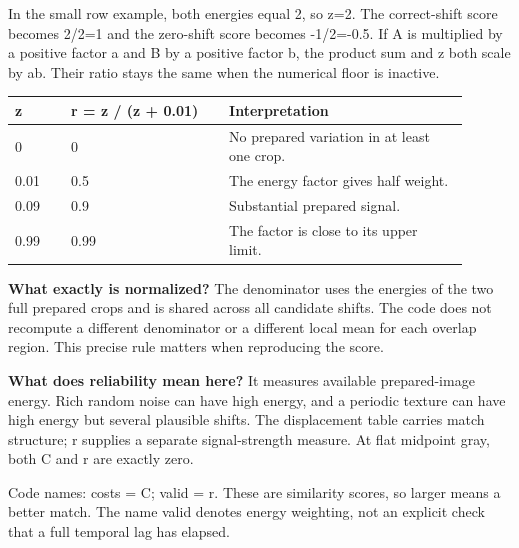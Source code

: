 \documentclass[11pt,letterpaper]{article}
\begin{document}
In the small row example, both energies equal 2, so z=2. The correct-shift score becomes 2/\allowbreak{}2=1 and the zero-shift score becomes -1/\allowbreak{}2=-0.5. If A is multiplied by a positive factor a and B by a positive factor b, the product sum and z both scale by ab. Their ratio stays the same when the numerical floor is inactive.


\begin{center}\small\renewcommand{\arraystretch}{1.16}\setlength{\tabcolsep}{4pt}\begin{tabular}{p{0.110\linewidth}p{0.312\linewidth}p{0.478\linewidth}}\toprule

\textbf{z} & \textbf{r = z /\allowbreak{} (z + 0.01)} & \textbf{Interpretation} \\

\midrule

0 & 0 & No prepared variation in at least one crop. \\

0.01 & 0.5 & The energy factor gives half weight. \\

0.09 & 0.9 & Substantial prepared signal. \\

0.99 & 0.99 & The factor is close to its upper limit. \\

\bottomrule\end{tabular}\end{center}

\textbf{What exactly is normalized?} The denominator uses the energies of the two full prepared crops and is shared across all candidate shifts. The code does not recompute a different denominator or a different local mean for each overlap region. This precise rule matters when reproducing the score.


\textbf{What does reliability mean here?} It measures available prepared-image energy. Rich random noise can have high energy, and a periodic texture can have high energy but several plausible shifts. The displacement table carries match structure; r supplies a separate signal-strength measure. At flat midpoint gray, both C and r are exactly zero.


{
\small\color{muted} Code names: costs = C; valid = r. These are similarity scores, so larger means a better match. The name valid denotes energy weighting, not an explicit check that a full temporal lag has elapsed.\par}
\end{document}

